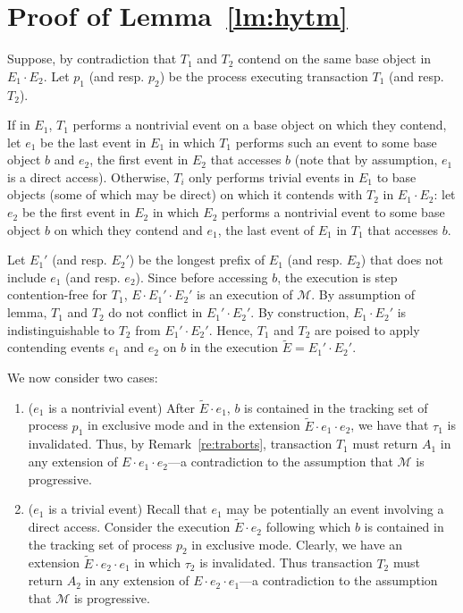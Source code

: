 \section{Proof of Lemma~\ref{lm:hytm}}
\label{app:lm}
Suppose, by contradiction that $T_1$ and $T_2$ 
contend on the same base object in $E_1\cdot E_2$.
Let $p_1$ (and resp. $p_2$) be the process executing transaction $T_1$ (and resp. $T_2$).

If in $E_1$, $T_1$ performs a nontrivial event on a base object on which they contend, let $e_1$ be the last
event in $E_1$ in which $T_1$ performs such an event to some base object $b$ and $e_2$, the first event
in $E_2$ that accesses $b$ (note that by assumption, $e_1$ is a direct access).
Otherwise, $T_i$ only performs trivial events in $E_1$ to base objects (some of which may be direct) on which it contends with $T_{2}$ in $E_1\cdot E_2$:
let $e_2$ be the first event in $E_2$ in which $E_2$ performs a nontrivial event to some base object $b$
on which they contend and $e_1$, the last event of $E_1$ in $T_1$ that accesses $b$.

Let $E_1'$ (and resp. $E_2'$) be the longest prefix of $E_1$ (and resp. $E_2$) that does not include
$e_1$ (and resp. $e_2$).
Since before accessing $b$, the execution is step contention-free for $T_1$, $E \cdot
E_1'\cdot E_2'$ is an execution of $\mathcal{M}$.
By assumption of lemma, $T_1$ and $T_2$ do not conflict in $E_1'\cdot E_2'$.
By construction, $E_1 \cdot E_2'$ is indistinguishable to $T_2$ from $E_1' \cdot E_2'$.
Hence, $T_1$ and $T_{2}$ are poised to apply contending events $e_1$ and $e_2$ on $b$ in the execution
$\tilde E=E_1' \cdot E_2'$.

We now consider two cases:
\begin{enumerate}
\item 
($e_1$ is a nontrivial event)
After $\tilde E\cdot e_1$, $b$ is contained in the tracking set of process
$p_1$ in exclusive mode and in the extension $\tilde E\cdot e_1 \cdot e_2$, we have that
$\tau_1$ is invalidated. Thus, by Remark~\ref{re:traborts}, transaction $T_1$ must return $A_1$ 
in any extension of $E\cdot e_1\cdot e_2$---a contradiction
to the assumption that $\mathcal{M}$ is progressive.   
\item
($e_1$ is a trivial event)
Recall that $e_1$ may be potentially an event involving a direct access.
Consider the execution $\tilde E\cdot e_2$ following which $b$ is contained in the tracking set of process
$p_{2}$ in exclusive mode. Clearly, we have an extension $\tilde E\cdot e_2 \cdot e_1$ in which
$\tau_{2}$ is invalidated. Thus transaction $T_{2}$ must return $A_{2}$ in any extension of $E\cdot e_2\cdot e_1$---a contradiction
to the assumption that $\mathcal{M}$ is progressive.   
\end{enumerate}
%

